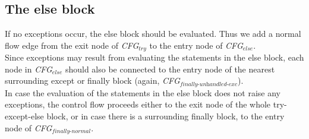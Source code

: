 \subsection{The else block}
If no exceptions occur, the else block should be evaluated. Thus we add a normal flow edge from the exit node of \textit{CFG$_{\textit{try}}$} to the entry node of \textit{CFG$_{\textit{else}}$}.\\
Since exceptions may result from evaluating the statements in the else block, each node in \textit{CFG$_{\textit{else}}$} should also be connected to the entry node of the nearest surrounding except or finally block (again, \textit{CFG$_{\textit{finally-unhandled-exc}}$}). \\
In case the evaluation of the statements in the else block does not raise any exceptions, the control flow proceeds either to the exit node of the whole try-except-else block, or in case there is a surrounding finally block, to the entry node of \textit{CFG$_{\textit{finally-normal}}$}.